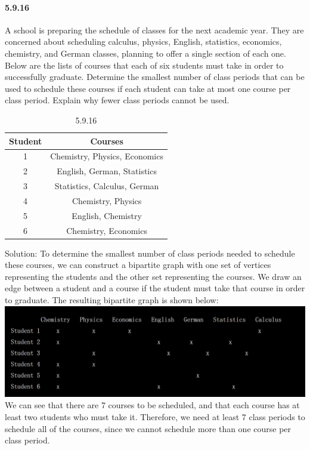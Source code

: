 \documentclass{article}
\begin{document}
\paragraph{5.9.16}
A school is preparing the schedule of classes for the next academic year. They are concerned about scheduling calculus, physics, English, statistics, economics, chemistry, and German classes, planning to offer a single section of each one. Below are the lists of courses that each of six students must take in order to successfully graduate. Determine the smallest number of class periods that can be used to schedule these courses if each student can take at most one course per class period. Explain why fewer class periods cannot be used.
\begin{table}[H]
\center
\begin{tabular}{|c|c|}
\hline
Student & Courses                       \\ \hline
1       & Chemistry, Physics, Economics \\ \hline
2       & English, German, Statistics   \\ \hline
3       & Statistics, Calculus, German  \\ \hline
4       & Chemistry, Physics            \\ \hline
5       & English, Chemistry            \\ \hline
6       & Chemistry, Economics          \\ \hline
\end{tabular}
\caption{5.9.16}
\end{table}
Solution:\newline
To determine the smallest number of class periods needed to schedule these courses, we can construct a bipartite graph with one set of vertices representing the students and the other set representing the courses. We draw an edge between a student and a course if the student must take that course in order to graduate. The resulting bipartite graph is shown below:\newline
\includegraphics{0090}\newline
We can see that there are 7 courses to be scheduled, and that each course has at least two students who must take it. Therefore, we need at least 7 class periods to schedule all of the courses, since we cannot schedule more than one course per class period.
\end{document}
